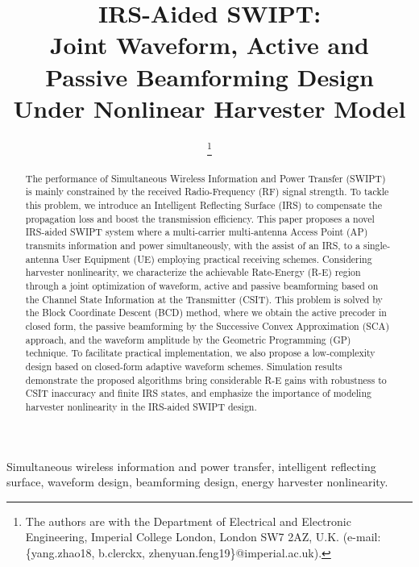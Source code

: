 \documentclass[journal,12pt,onecolumn,draftclsnofoot]{IEEEtran}
\begin{document}
	\title{IRS-Aided SWIPT:\\Joint Waveform, Active and Passive Beamforming Design Under Nonlinear Harvester Model}
	\author{
		\thanks{
			The authors are with the Department of Electrical and Electronic Engineering, Imperial College London, London SW7 2AZ, U.K. (e-mail: \{yang.zhao18, b.clerckx, zhenyuan.feng19\}@imperial.ac.uk).
		}
	}
	\maketitle


	\begin{abstract}
		The performance of Simultaneous Wireless Information and Power Transfer (SWIPT) is mainly constrained by the received Radio-Frequency (RF) signal strength. To tackle this problem, we introduce an Intelligent Reflecting Surface (IRS) to compensate the propagation loss and boost the transmission efficiency. This paper proposes a novel IRS-aided SWIPT system where a multi-carrier multi-antenna Access Point (AP) transmits information and power simultaneously, with the assist of an IRS, to a single-antenna User Equipment (UE) employing practical receiving schemes. Considering harvester nonlinearity, we characterize the achievable Rate-Energy (R-E) region through a joint optimization of waveform, active and passive beamforming based on the Channel State Information at the Transmitter (CSIT). This problem is solved by the Block Coordinate Descent (BCD) method, where we obtain the active precoder in closed form, the passive beamforming by the Successive Convex Approximation (SCA) approach, and the waveform amplitude by the Geometric Programming (GP) technique. To facilitate practical implementation, we also propose a low-complexity design based on closed-form adaptive waveform schemes. Simulation results demonstrate the proposed algorithms bring considerable R-E gains with robustness to CSIT inaccuracy and finite IRS states, and emphasize the importance of modeling harvester nonlinearity in the IRS-aided SWIPT design.
	\end{abstract}


	\begin{IEEEkeywords}
		Simultaneous wireless information and power transfer, intelligent reflecting surface, waveform design, beamforming design, energy harvester nonlinearity.
	\end{IEEEkeywords}
\end{document}
